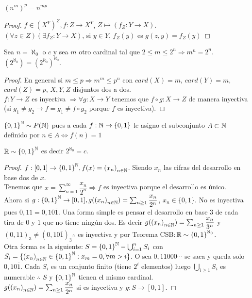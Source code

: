 \begin{prop}
  \({(n^m)}^p = n^{mp} \)
  \begin{proof}
    \(f \in {(X^Y)}^Z, f: Z \to X^Y\), \(Z \mapsto (f_Z: Y \to X)\). \\
    \((\forall z \in Z)(\exists f_Z: Y \to X)\), si \(y \in Y\), \(f_Z(y)\) es \(g(z, y) = f_Z(y)\)
  \end{proof}
\end{prop}

\begin{theorem}
  Sea \(n = \aleph_0\) o \(c\) y sea \(m\) otro cardinal tal que \(2 \leq m \leq 2^n \Rightarrow m^n = 2^n\). \((2^{\aleph_0}) = (2^{\aleph_0})^{\aleph_0} \).
  \begin{proof}
    En general si \(m \leq p \Rightarrow m^m \leq p^n\) con \(card(X) = m\), \(card(Y) = m\), \(card(Z) = p\), \(X,Y,Z\) disjuntos dos a dos. \\
    \(f: Y \to Z\) es inyectiva \(\Rightarrow \forall g: X \to Y\) tenemos que \(f \circ g: X \to Z\) de manera inyectiva (si \(g_1 \neq g_2 \to f = g_1 \neq f \circ g_2\) porque \(f\) es inyectiva).
  \end{proof}
\end{theorem}

\begin{note}
  \( {\{ 0, 1 \}}^{\mathbb{N}} \sim P(\mathbb{N})\) pues a cada \(f: \mathbb{N} \to \{0, 1\} \) le asigno el subconjunto \(A \subset \mathbb{N} \) definido por \(n \in A \iff f(n) = 1\)
\end{note}

\begin{theorem}
  \(\mathbb{R} \sim {\{ 0, 1 \}}^{\mathbb{N}} \) es decir \(2^{\aleph_0} = c\).
  \begin{proof}
    \(f: [0, 1] \to {\{ 0, 1 \}}^{\mathbb{N}}, f(x) = {(x_n)}_{n \in \mathbb{N}} \). Siendo \(x_n\) las cifras del desarrollo en base dos de \(x\). \\
    Tenemos que \(x = \sum_{n=1}^\infty \dfrac{x_n}{2^n} \Rightarrow f\) es inyectiva porque el desarrollo es único. \\
    Ahora si \(g: {\{ 0, 1 \}}^{\mathbb{N}} \to [0, 1], g({(x_n)}_{n \in \mathbb{N}}) = \sum_{n \geq 1} \dfrac{x_n}{2^n} \), \(x_n \in \{0, 1\} \). No es inyectiva pues \(0,11 = 0,10\overline{1} \).
    Una forma simple es pensar el desarrollo en base \(3\) de cada tira de \(0\) y \(1\) que no tiene ningún dos. Es decir \(g({(x_n)}_{n \in \mathbb{N}}) = \sum_{n \geq 1} \dfrac{x_n}{3^n} \) y \({(0,11)}_3 \neq (0,10\overline{1})_3 \therefore \)
    es inyectiva y por Teorema CSB:\(\, \mathbb{R} \sim {\{0,1\}}^{\aleph_0} \). \\
    Otra forma es la siguiente:
    \(S = {\{0, 1\}}^{\mathbb{N}} - \bigcup_{i=1}^n S_i\) con \(S_i = \{ {(x_n)}_{n \in \mathbb{N}} \in {\{0, 1\}}^{\mathbb{N}} : x_m = 0, \forall m > i \} \). O sea \(0,11000\cdots \) se saca y queda solo \(0,10\overline{1} \).
    Cada \(S_i\) es un conjunto finito (tiene \(2^i\) elementos) luego \(\bigcup_{i \geq 1} S_i\) es numerable \(\therefore \) \(S\) y \({\{0, 1\}}^{\mathbb{N}} \) tienen el mismo cardinal. \\
    \(g({(x_n)}_{n \in \mathbb{N}}) = \sum_{n \geq 1} \dfrac{x_n}{2^n} \) si es inyectiva y \(g: S \to [0, 1]\).
  \end{proof}
\end{theorem}

